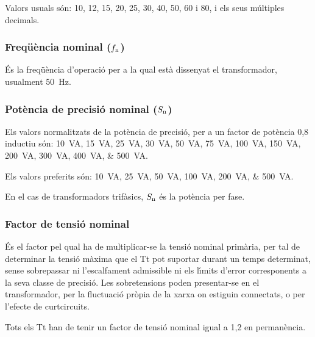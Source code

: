  Valors usuals s\'{o}n: 10, 12, 15, 20, 25, 30, 40, 50, 60 i 80, i els seus m\'{u}ltiples decimals.

\subsubsection{Freq\"{u}\`{e}ncia nominal ($f_\mathrm{n}$)}

 \'{E}s la freq\"{u}\`{e}ncia d'operaci\'{o} per a la qual  est\`{a} dissenyat el transformador, usualment \SI{50}{Hz}.

\subsubsection{Pot\`{e}ncia de precisi\'{o} nominal ($S_\mathrm{n}$)}

Els valors normalitzats de la pot\`{e}ncia de precisi\'{o}, per
a un factor de pot\`{e}ncia 0,8 inductiu s\'{o}n: \SIlist{10; 15; 25; 30; 50; 75; 100; 150;
 200; 300; 400; 500}{VA}.

 Els valors preferits s\'{o}n: \SIlist{10; 25; 50; 100; 200; 500}{VA}.

En el cas de transformadors trif\`{a}sics, $S_\mathrm{n}$ \'{e}s la pot\`{e}ncia per fase.

\subsubsection{Factor de tensi\'{o} nominal}

 \'{E}s el factor pel qual ha de
multiplicar-se la tensi\'{o} nominal prim\`{a}ria, per tal de determinar la
tensi\'{o} m\`{a}xima que el Tt pot suportar durant un temps determinat,
sense sobrepassar ni l'escalfament admissible ni els l\'{\i}mits d'error
corresponents a la seva classe de precisi\'{o}. Les sobretensions poden
presentar-se en el transformador,  per la fluctuaci\'{o}
pr\`{o}pia de la xarxa on estiguin connectats, o per l'efecte de curtcircuits.

Tots els  Tt han de tenir un factor de tensi\'{o} nominal igual a 1,2 en perman\`{e}ncia.

